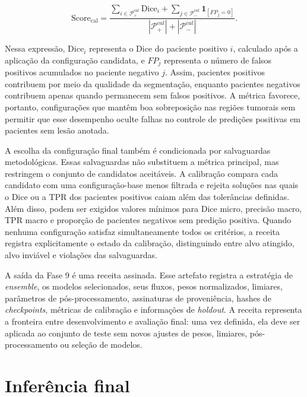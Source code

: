 \begin{equation}
    \mathrm{Score}_{\mathrm{cal}} =
    \frac{
    \sum_{i\in\mathcal{P}_+^{cal}}\mathrm{Dice}_i
    +
    \sum_{j\in\mathcal{P}_-^{cal}}\mathbf{1}_{[FP_j=0]}
    }{
    |\mathcal{P}_+^{cal}| + |\mathcal{P}_-^{cal}|
    }.
    \label{eq:balanced_calibration_score}
\end{equation}

Nessa expressão, $\mathrm{Dice}_i$ representa o Dice do paciente positivo $i$,
calculado após a aplicação da configuração candidata, e $FP_j$ representa o
número de falsos positivos acumulados no paciente negativo $j$. Assim, pacientes
positivos contribuem por meio da qualidade da segmentação, enquanto pacientes
negativos contribuem apenas quando permanecem sem falsos positivos. A métrica
favorece, portanto, configurações que mantêm boa sobreposição nas regiões
tumorais sem permitir que esse desempenho oculte falhas no controle de
predições positivas em pacientes sem lesão anotada.

A escolha da configuração final também é condicionada por salvaguardas
metodológicas. Essas salvaguardas não substituem a métrica principal, mas
restringem o conjunto de candidatos aceitáveis. A calibração compara cada
candidato com uma configuração-base menos filtrada e rejeita soluções nas quais o
Dice ou a TPR dos pacientes positivos caiam além das tolerâncias definidas. Além
disso, podem ser exigidos valores mínimos para Dice micro, precisão macro, TPR
macro e proporção de pacientes negativos sem predição positiva. Quando nenhuma
configuração satisfaz simultaneamente todos os critérios, a receita registra
explicitamente o estado da calibração, distinguindo entre alvo atingido, alvo
inviável e violações das salvaguardas.

A saída da Fase 9 é uma receita  assinada. Esse artefato registra a estratégia
de \textit{ensemble}, os modelos selecionados, seus fluxos, pesos normalizados,
limiares, parâmetros de pós-processamento, assinaturas de proveniência, hashes de
\textit{checkpoints}, métricas de calibração e informações de \textit{holdout}.
A receita representa a fronteira entre desenvolvimento e avaliação final: uma vez
definida, ela deve ser aplicada ao conjunto de teste sem novos ajustes de pesos,
limiares, pós-processamento ou seleção de modelos.

\section{Inferência final}\label{sec:met_inferencia_final}

